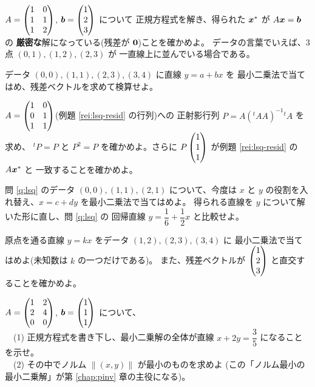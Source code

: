 \begin{mondai}[基本]\label{q:lsq-ex4}
$A = \begin{pmatrix}1 & 0 \\ 1 & 1 \\ 1 & 2\end{pmatrix}$, $\bm{b} = \begin{pmatrix}1 \\ 2 \\ 3\end{pmatrix}$ について
正規方程式を解き、得られた $\bm{x}^*$ が $A\bm{x} = \bm{b}$ の
\textbf{厳密な}解になっている(残差が $\bm{0}$)ことを確かめよ。
データの言葉でいえば、$3$ 点 $(0,1), (1,2), (2,3)$ が
一直線上に並んでいる場合である。
\end{mondai}

\begin{mondai}[標準]\label{q:lsq-ex5}
データ $(0, 0), (1, 1), (2, 3), (3, 4)$ に直線 $y = a + bx$ を
最小二乗法で当てはめ、残差ベクトルを求めて検算せよ。
\end{mondai}

\begin{mondai}[標準]\label{q:lsq-ex6}
$A = \begin{pmatrix}1 & 0 \\ 0 & 1 \\ 1 & 1\end{pmatrix}$(例題 \ref{rei:lsq-resid} の行列)への
正射影行列 $P = A({}^t\!AA)^{-1}{}^t\!A$ を求め、
${}^t\!P = P$ と $P^2 = P$ を確かめよ。さらに
$P\begin{pmatrix}1 \\ 1 \\ 1\end{pmatrix}$ が例題 \ref{rei:lsq-resid} の $A\bm{x}^*$ と
一致することを確かめよ。
\end{mondai}

\begin{mondai}[標準]\label{q:lsq-ex7}
問 \ref{q:lsq} のデータ $(0, 0), (1, 1), (2, 1)$ について、今度は
$x$ と $y$ の役割を入れ替え、$x = c + dy$ を最小二乗法で当てはめよ。
得られる直線を $y$ について解いた形に直し、問 \ref{q:lsq} の
回帰直線 $y = \dfrac{1}{6} + \dfrac{1}{2}x$ と比較せよ。
\end{mondai}

\begin{mondai}[標準]\label{q:lsq-ex8}
原点を通る直線 $y = kx$ をデータ $(1, 2), (2, 3), (3, 4)$ に
最小二乗法で当てはめよ(未知数は $k$ の一つだけである)。
また、残差ベクトルが $\begin{pmatrix}1 \\ 2 \\ 3\end{pmatrix}$ と直交することを確かめよ。
\end{mondai}

\begin{mondai}[発展]\label{q:lsq-ex9}
$A = \begin{pmatrix}1 & 2 \\ 2 & 4 \\ 0 & 0\end{pmatrix}$, $\bm{b} = \begin{pmatrix}1 \\ 1 \\ 1\end{pmatrix}$ について、\\
　(1) 正規方程式を書き下し、最小二乗解の全体が直線
$x + 2y = \dfrac{3}{5}$ になることを示せ。\\
　(2) その中でノルム $\|(x, y)\|$ が最小のものを求めよ
(この「ノルム最小の最小二乗解」が第 \ref{chap:pinv} 章の主役になる)。
\end{mondai}

